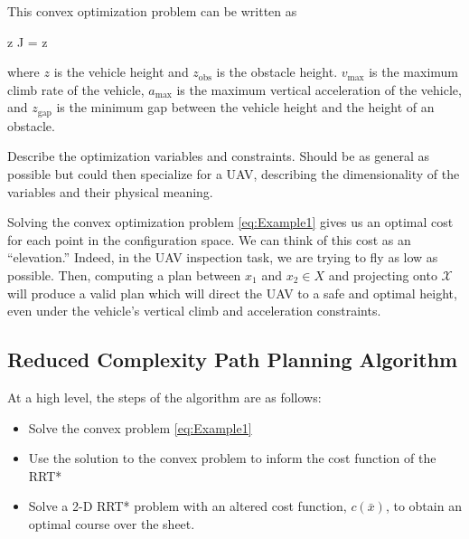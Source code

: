 \documentclass[letterpaper, 12pt]{article}
\def\startmodif{\color{blue}}
\def\stopmodif{\color{black}\normalcolor}
\newcommand{\dac}[1]{\color{red}#1}
\begin{document}
This convex optimization problem can be written as 

\begin{mini!}
    {\startmodif z \stopmodif}{J = z}
    {\label{eq:Example1}}
    {}
\end{mini!}
where $z$ is the vehicle height and $z_\text{obs}$ is the obstacle height. $v_\text{max}$ is the maximum climb rate of the vehicle, $a_\text{max}$ is the maximum vertical acceleration of the vehicle, and $z_\text{gap}$ is the minimum gap between the vehicle height and the height of an obstacle.

{\dac Describe the optimization variables and constraints. Should be as general as possible but could then specialize for a UAV, describing the dimensionality of the variables and their physical meaning.}

\startmodif Solving the convex optimization problem \eqref{eq:Example1} \stopmodif gives us an optimal cost for each point in the configuration space. We can think of this cost as an ``elevation.'' Indeed, in the UAV inspection task, we are trying to fly as low as possible. Then, computing a plan between $x_1$ and $x_2 \in X$ and projecting onto $\mathcal{X}$ will produce a valid plan which will direct the UAV to a safe and optimal height, even under the vehicle's vertical climb and acceleration constraints.

\subsection{\startmodif Reduced Complexity Path Planning Algorithm \stopmodif}

At a high level, the steps of the algorithm are as follows:

\begin{itemize}
    \item Solve the convex problem \eqref{eq:Example1}
    \item Use the solution to the convex problem to inform the cost function of the RRT*
    \item Solve a 2-D RRT* problem with an altered cost function, $c(\bar{x})$, to obtain an optimal course over the sheet.
    

\end{itemize}
\end{document}
